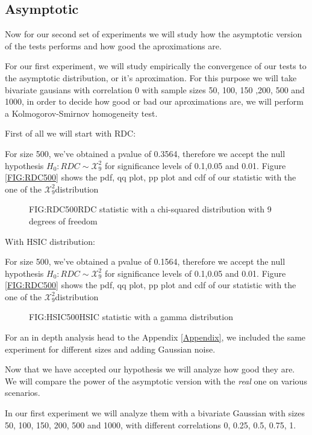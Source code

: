 \subsection{Asymptotic}

Now for our second set of experiments we will study how the asymptotic version of the tests performs and how good the aproximations are.

For our first experiment, we will study empirically the convergence of our tests to the asymptotic distribution, or it's aproximation. For this purpose we will take  bivariate gausians with correlation 0 with sample sizes  50, 100, 150 ,200, 500 and 1000, in order to decide how good or bad our aproximations are, we will perform a Kolmogorov-Smirnov homogeneity test.

First of all we will start with RDC:

For size 500, we've obtained a pvalue of 0.3564, therefore we accept the null hypothesis $H_{0}: RDC\sim \mathcal{X}^{2}_{9}$ for significance levels of 0.1,0.05 and 0.01. Figure \ref{FIG:RDC500} shows the pdf, qq plot, pp plot and cdf of our statistic with the one of the $\mathcal{X}^{2}_{9}$distribution

\begin{figure}[RDC Asymptotic distribution]{FIG:RDC500}{RDC statistic with a chi-squared distribution with 9 degrees of freedom}
\end{figure}

With HSIC distribution:

For size 500, we've obtained a pvalue of 0.1564, therefore we accept the null hypothesis $H_{0}: RDC\sim \mathcal{X}^{2}_{9}$ for significance levels of 0.1,0.05 and 0.01. Figure \ref{FIG:RDC500} shows the pdf, qq plot, pp plot and cdf of our statistic with the one of the $\mathcal{X}^{2}_{9}$distribution
\begin{figure}[HSIC Asymptotic distribution]{FIG:HSIC500}{HSIC statistic with a gamma distribution}
\end{figure}

For an in depth analysis head to the Appendix \ref{Appendix}, we included the same experiment for different sizes and adding Gaussian noise.

Now that we have accepted our hypothesis we will analyze how good they are. We will compare the power of the asymptotic version with the \textit{real} one on various scenarios.

In our first experiment we will analyze them with a bivariate Gaussian with sizes 50, 100, 150, 200, 500 and 1000, with different correlations 0, 0.25, 0.5, 0.75, 1.

